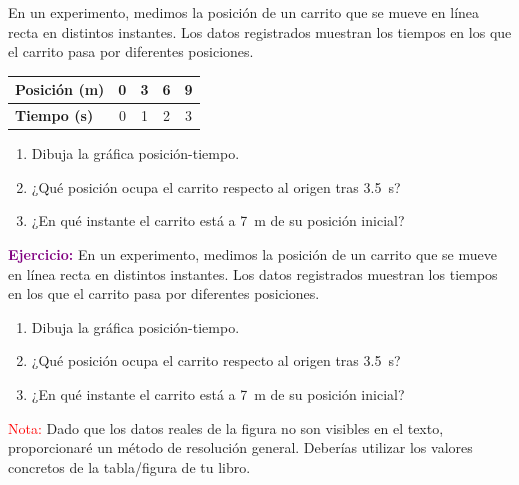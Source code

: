 \begin{exercise}
    En un experimento, medimos la posición de un carrito que se mueve en línea recta en distintos instantes. Los datos registrados muestran los tiempos en los que el carrito pasa por diferentes posiciones.
    \begin{table}[H]
        \centering
        \renewcommand{\arraystretch}{1.5}
        \begin{tabular}{Occcc}
            \bottomrule
            \textcolor{ocre}{\textbf{Posición (\unit{\metre})}} & 0 & 3 & 6 & 9 \\
            \hline
            \textcolor{ocre}{\textbf{Tiempo (\unit{\s})}}         & 0 & 1 & 2 & 3 \\
            \toprule
        \end{tabular}
        \label{tab:ejercicio1}
    \end{table}
    \begin{enumerate}[label=\letraminuscula]
    \item Dibuja la gráfica posición-tiempo.
    \item ¿Qué posición ocupa el carrito respecto al origen tras \qty{3.5}{\s}?
    \item ¿En qué instante el carrito está a \qty{7}{\m} de su posición inicial?
    \end{enumerate}

    \begin{solu}
        \textbf{\textcolor{purple}{Ejercicio:}} En un experimento, medimos la posición de un carrito que se mueve en línea recta en distintos instantes. Los datos registrados muestran los tiempos en los que el carrito pasa por diferentes posiciones.
        \begin{enumerate}[label=\letraminuscula]
            \item Dibuja la gráfica posición-tiempo.
            \item ¿Qué posición ocupa el carrito respecto al origen tras \qty{3.5}{\s}?
            \item ¿En qué instante el carrito está a \qty{7}{\m} de su posición inicial?
        \end{enumerate}

        \vspace{0.3cm}

        \textcolor{red}{Nota:} Dado que los datos reales de la figura no son visibles en el texto, proporcionaré un método de resolución general. Deberías utilizar los valores concretos de la tabla/figura de tu libro.


\end{solu}
\end{exercise}

